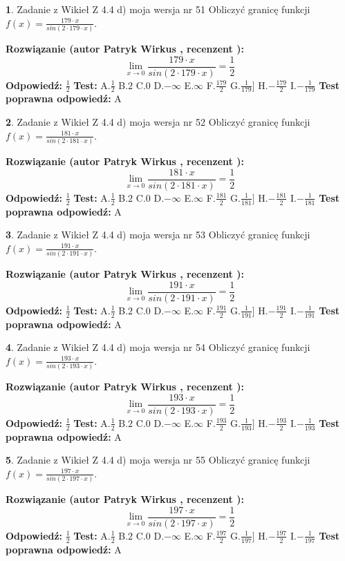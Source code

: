 \documentclass[12pt, a4paper]{article}
\theoremstyle{definition} %
\newtheorem{zad}{}
\newcommand{\zadStart}[1]{\begin{zad}#1\newline}
\newcommand{\zadStop}{\end{zad}}
\newcommand{\rozwStart}[2]{\noindent \textbf{Rozwiązanie (autor #1 , recenzent #2): }\newline}
\newcommand{\rozwStop}{\newline}
\newcommand{\odpStart}{\noindent \textbf{Odpowiedź:}\newline}
\newcommand{\odpStop}{\newline}
\newcommand{\testStart}{\noindent \textbf{Test:}\newline}
\newcommand{\testStop}{\newline}
\newcommand{\kluczStart}{\noindent \textbf{Test poprawna odpowiedź:}\newline}
\newcommand{\kluczStop}{\newline}
\begin{document}
\zadStart{Zadanie z Wikieł Z 4.4 d) moja wersja nr 51}
Obliczyć granicę funkcji $f(x)=\frac{179\cdot x}{sin(2 \cdot179\cdot x)}$.
\zadStop
\rozwStart{Patryk Wirkus}{}
$$\lim\limits_{x\to 0}\frac{179\cdot x}{sin(2 \cdot179\cdot x)}=\frac{1}{2}$$
\rozwStop
\odpStart
$\frac{1}{2}$
\odpStop
\testStart
A.$\frac{1}{2}$
B.$2$
C.$0$
D.$-\infty$
E.$\infty$
F.$\frac{179}{2}$
G.$\frac{1}{179}]$
H.$-\frac{179}{2}$
I.$-\frac{1}{179}$
\testStop
\kluczStart
A
\kluczStop



\zadStart{Zadanie z Wikieł Z 4.4 d) moja wersja nr 52}
Obliczyć granicę funkcji $f(x)=\frac{181\cdot x}{sin(2 \cdot181\cdot x)}$.
\zadStop
\rozwStart{Patryk Wirkus}{}
$$\lim\limits_{x\to 0}\frac{181\cdot x}{sin(2 \cdot181\cdot x)}=\frac{1}{2}$$
\rozwStop
\odpStart
$\frac{1}{2}$
\odpStop
\testStart
A.$\frac{1}{2}$
B.$2$
C.$0$
D.$-\infty$
E.$\infty$
F.$\frac{181}{2}$
G.$\frac{1}{181}]$
H.$-\frac{181}{2}$
I.$-\frac{1}{181}$
\testStop
\kluczStart
A
\kluczStop



\zadStart{Zadanie z Wikieł Z 4.4 d) moja wersja nr 53}
Obliczyć granicę funkcji $f(x)=\frac{191\cdot x}{sin(2 \cdot191\cdot x)}$.
\zadStop
\rozwStart{Patryk Wirkus}{}
$$\lim\limits_{x\to 0}\frac{191\cdot x}{sin(2 \cdot191\cdot x)}=\frac{1}{2}$$
\rozwStop
\odpStart
$\frac{1}{2}$
\odpStop
\testStart
A.$\frac{1}{2}$
B.$2$
C.$0$
D.$-\infty$
E.$\infty$
F.$\frac{191}{2}$
G.$\frac{1}{191}]$
H.$-\frac{191}{2}$
I.$-\frac{1}{191}$
\testStop
\kluczStart
A
\kluczStop



\zadStart{Zadanie z Wikieł Z 4.4 d) moja wersja nr 54}
Obliczyć granicę funkcji $f(x)=\frac{193\cdot x}{sin(2 \cdot193\cdot x)}$.
\zadStop
\rozwStart{Patryk Wirkus}{}
$$\lim\limits_{x\to 0}\frac{193\cdot x}{sin(2 \cdot193\cdot x)}=\frac{1}{2}$$
\rozwStop
\odpStart
$\frac{1}{2}$
\odpStop
\testStart
A.$\frac{1}{2}$
B.$2$
C.$0$
D.$-\infty$
E.$\infty$
F.$\frac{193}{2}$
G.$\frac{1}{193}]$
H.$-\frac{193}{2}$
I.$-\frac{1}{193}$
\testStop
\kluczStart
A
\kluczStop



\zadStart{Zadanie z Wikieł Z 4.4 d) moja wersja nr 55}
Obliczyć granicę funkcji $f(x)=\frac{197\cdot x}{sin(2 \cdot197\cdot x)}$.
\zadStop
\rozwStart{Patryk Wirkus}{}
$$\lim\limits_{x\to 0}\frac{197\cdot x}{sin(2 \cdot197\cdot x)}=\frac{1}{2}$$
\rozwStop
\odpStart
$\frac{1}{2}$
\odpStop
\testStart
A.$\frac{1}{2}$
B.$2$
C.$0$
D.$-\infty$
E.$\infty$
F.$\frac{197}{2}$
G.$\frac{1}{197}]$
H.$-\frac{197}{2}$
I.$-\frac{1}{197}$
\testStop
\kluczStart
A
\kluczStop
\end{document}
